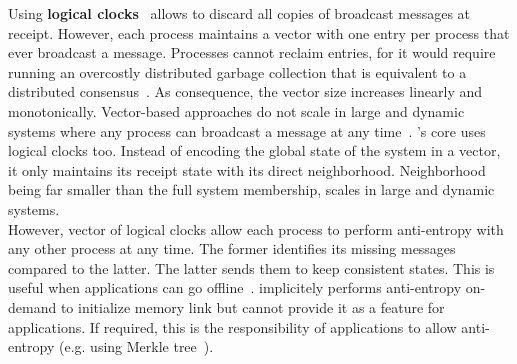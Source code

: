 Using \textbf{logical clocks}~\cite{malkhi2007concise,mukund2014optimized}
allows to discard all copies of broadcast messages at receipt. However, each
process maintains a vector with one entry per process that ever broadcast a
message.  Processes cannot reclaim entries, for it would require running an
overcostly distributed garbage collection that is equivalent to a distributed
consensus~\cite{abdullahi1998garbage}. As consequence, the vector size increases
linearly and monotonically. Vector-based approaches do not scale in large and
dynamic systems where any process can broadcast a message at any
time~\cite{nedelec2016crate}. \RPCBROADCAST's core uses logical clocks
too. Instead of encoding the global state of the system in a vector, it only
maintains its receipt state with its direct neighborhood. Neighborhood being far
smaller than the full system membership,
\RPCBROADCAST scales in large and dynamic systems. \\
However, vector of logical clocks allow each process to perform anti-entropy
with any other process at any time. The former identifies its missing messages
compared to the latter.  The latter sends them to keep consistent states. This
is useful when applications can go
offline~\cite{demers1987epidemic}. \RPCBROADCAST implicitely performs
anti-entropy on-demand to initialize memory link but cannot provide it as a
feature for applications. If required, this is the responsibility of
applications to allow anti-entropy (e.g. using Merkle
tree~\cite{merkle1988digital}).

